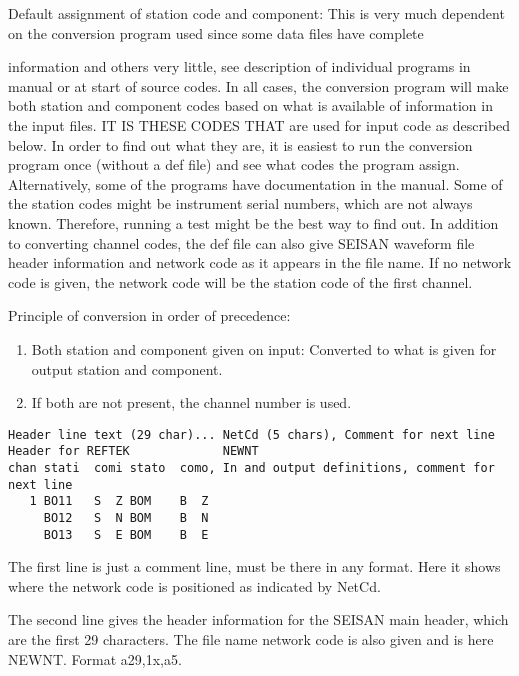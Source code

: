 Default assignment of station code and component: \newline
This is very much dependent on the conversion program used since some data files have complete 

information and others very little, see description of individual programs in manual or at start of source codes. In all cases, the conversion program will make both station and component codes based on what is available of information in the input files. IT IS THESE CODES THAT are used for input code as described below. In order to find out what they are, it is easiest to run the conversion program once (without a def file) and see what codes the program assign. Alternatively, some of the programs have documentation in the manual. Some of the station codes might be instrument serial numbers, which are not always known. Therefore, running a test might be the best way to find out. \newline
In addition to converting channel codes, the def file can also give SEISAN waveform file header information and network code as it appears in the file name. If no network code is given, the network code will be the station code of the first channel. 

Principle of conversion in order of precedence: 
\begin{enumerate}
\item
 Both station and component given on input: Converted to what is given for output station and component. 
\item
 If both are not present, the channel number is used. 
\end{enumerate}

\begin{verbatim}
Header line text (29 char)... NetCd (5 chars), Comment for next line
Header for REFTEK             NEWNT 
chan stati  comi stato  como, In and output definitions, comment for next line
   1 BO11   S  Z BOM    B  Z  
     BO12   S  N BOM    B  N  
     BO13   S  E BOM    B  E  
\end{verbatim}

The first line is just a comment line, must be there in any format. Here it shows where the network code is positioned as indicated by NetCd. 

The second line gives the header information for the SEISAN main header, which are the first 29 characters. The file name network code is also given and is here NEWNT. Format a29,1x,a5. 

